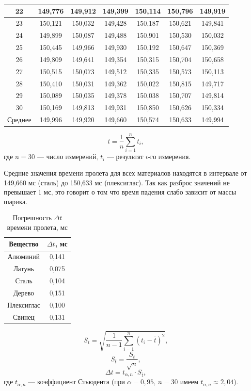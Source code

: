\documentclass[a4paper,14pt]{extarticle}
\theoremstyle{plain}
\theoremstyle{remark}
\theoremstyle{definition}
\begin{document}
\begin{table}[H]
\begin{tabular}{|c|c|c|c|c|c|c|}
\hline
22 & 149,776 & 149,912 & 149,399 & 150,114 & 150,796 & 149,919 \\
\hline
23 & 150,121 & 150,032 & 149,428 & 150,187 & 150,621 & 149,841 \\
\hline
24 & 149,899 & 150,087 & 149,488 & 150,901 & 150,530 & 150,032 \\
\hline
25 & 150,445 & 149,966 & 149,930 & 150,192 & 150,647 & 150,369 \\
\hline
26 & 149,809 & 149,641 & 149,354 & 150,315 & 150,704 & 150,658 \\
\hline
27 & 150,515 & 150,073 & 149,512 & 150,335 & 150,573 & 150,113 \\
\hline
28 & 150,410 & 150,031 & 149,362 & 150,022 & 150,815 & 149,717 \\
\hline
29 & 150,089 & 150,035 & 149,378 & 150,038 & 150,707 & 149,814 \\
\hline
30 & 150,169 & 149,813 & 149,931 & 150,850 & 150,626 & 150,334 \\
\hline
\hline
\multicolumn{1}{|c|}{Среднее} & 
149,996 & 149,920 & 149,660 & 150,574 & 150,633 & 149,994 \\
\hline
\end{tabular}
\end{table}
\begin{equation}
\bar{t} = \frac{1}{n}\sum_{i=1}^{n} t_i, \tag{3}
\end{equation}
где $n = 30$ — число измерений, $t_i$ — результат $i$-го измерения.

Средние значения времени пролета для всех материалов находятся в интервале от 149,660 мс (сталь) до 150,633 мс (плексиглас). Так как разброс значений не превышает 1 мс, это говорит о том что время падения слабо зависит от массы шарика.

\begin{table}[H]
\centering
\caption{Погрешность $\Delta t$ времени пролета, мс}
\label{tabl:3}
\begin{tabular}{|c|c|}
\hline
Вещество & $\Delta t$, мс \\
\hline
Алюминий & 0,141 \\
\hline
Латунь & 0,075 \\
\hline
Сталь & 0,104 \\
\hline
Дерево & 0,151 \\
\hline
Плексиглас & 0,100 \\
\hline
Свинец & 0,131 \\
\hline
\end{tabular}
\end{table}
\begin{equation}
S_t = \sqrt{\frac{1}{n-1}\sum_{i=1}^{n}(t_i - \bar{t})^2}, \tag{4}
\end{equation}
\begin{equation}
S_{\bar{t}} = \frac{S_t}{\sqrt{n}}, \tag{5}
\end{equation}
\begin{equation}
\Delta t = t_{\alpha, n} \cdot S_{\bar{t}}, \tag{6}
\end{equation}
где $t_{\alpha, n}$ — коэффициент Стьюдента (при $\alpha = 0,95$, $n = 30$ имеем $t_{\alpha, n} \approx 2,04$).
\end{document}
